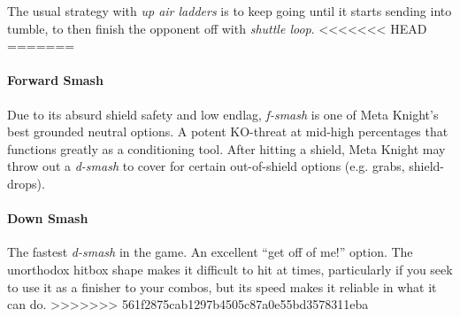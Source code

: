 The usual strategy with \textit{up air ladders} is to keep going until it starts sending into tumble, to then finish the opponent off with \textit{shuttle loop}.
<<<<<<< HEAD
=======

\paragraph{Forward Smash}
Due to its absurd shield safety and low endlag, \textit{f-smash} is one of Meta Knight's best grounded neutral options. A potent KO-threat at mid-high percentages that functions greatly as a conditioning tool. After hitting a shield, Meta Knight may throw out a \textit{d-smash} to cover for certain out-of-shield options (e.g. grabs, shield-drops).

\paragraph{Down Smash}
The fastest \textit{d-smash} in the game. An excellent ``get off of me!'' option. The unorthodox hitbox shape makes it difficult to hit at times, particularly if you seek to use it as a finisher to your combos, but its speed makes it reliable in what it can do.
>>>>>>> 561f2875cab1297b4505c87a0e55bd3578311eba

